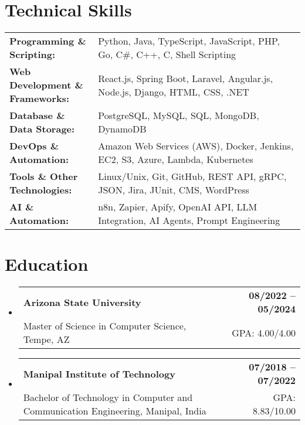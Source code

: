 \documentclass[letterpaper,11pt]{article}
\makeatletter
\newcommand{\educationSubheading}[4]{
  \vspace{-2pt}\item
    \begin{tabular*}{1.0\textwidth}[t]{l@{\extracolsep{\fill}}r}
      \textbf{\small #1} & \textbf{\small #2} \\
      {\small#3} & {\small #4} \\
    \end{tabular*}\vspace{-7pt}
}
\newcommand{\resumeSubHeadingListStart}{\begin{itemize}[leftmargin=0pt, label={}]}
\newcommand{\resumeSubHeadingListEnd}{\end{itemize}}
\makeatother
\begin{document}
\section{Technical Skills}
        \vspace{-14pt}
        \begin{table}[h]
            \footnotesize
            \begin{tabular}{p{0.3\linewidth} p{0.7\linewidth}}
                \textbf{Programming \& Scripting:} & Python, Java, TypeScript, JavaScript, PHP, Go, C\#, C++, C, Shell Scripting \\
                \textbf{Web Development \& Frameworks:} & React.js, Spring Boot, Laravel, Angular.js, Node.js, Django, HTML, CSS, .NET \\
                \textbf{Database \& Data Storage:} & PostgreSQL, MySQL, SQL, MongoDB, DynamoDB \\
                \textbf{DevOps \& Automation:} & Amazon Web Services (AWS), Docker, Jenkins, EC2, S3, Azure, Lambda, Kubernetes \\
                \textbf{Tools \& Other Technologies:} & Linux/Unix, Git, GitHub, REST API, gRPC, JSON, Jira, JUnit, CMS, WordPress \\
                \textbf{AI \& Automation:} & n8n, Zapier, Apify, OpenAI API, LLM Integration, AI Agents, Prompt Engineering \\
            \end{tabular}
        \end{table}

 \vspace{-15pt}

\section{Education}
  \resumeSubHeadingListStart
    \educationSubheading
      {Arizona State University}{08/2022 -- 05/2024}
      {Master of Science in Computer Science, Tempe, AZ}{GPA: 4.00/4.00}

    \educationSubheading
      {Manipal Institute of Technology}{07/2018 -- 07/2022}
      {Bachelor of Technology in Computer and Communication Engineering, Manipal, India}{GPA: 8.83/10.00}
  \resumeSubHeadingListEnd
\end{document}
